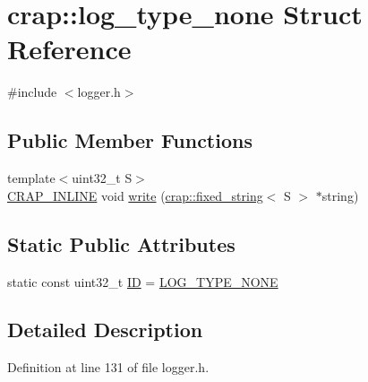 \hypertarget{structcrap_1_1log__type__none}{\section{crap\+:\+:log\+\_\+type\+\_\+none Struct Reference}
\label{structcrap_1_1log__type__none}
}


{\ttfamily \#include $<$logger.\+h$>$}

\subsection*{Public Member Functions}
\begin{DoxyCompactItemize}
\item 
{\footnotesize template$<$uint32\+\_\+t S$>$ }\\\hyperlink{config__x86_8h_a5a40526b8d842e7ff731509998bb0f1c}{C\+R\+A\+P\+\_\+\+I\+N\+L\+I\+N\+E} void \hyperlink{structcrap_1_1log__type__none_a0d844ed1b7b13c7ae0398da665d45919}{write} (\hyperlink{classcrap_1_1fixed__string}{crap\+::fixed\+\_\+string}$<$ S $>$ $\ast$string)
\end{DoxyCompactItemize}
\subsection*{Static Public Attributes}
\begin{DoxyCompactItemize}
\item 
static const uint32\+\_\+t \hyperlink{structcrap_1_1log__type__none_a507790af8e4624f88147ccbc3293407f}{I\+D} = \hyperlink{logger_8h_af309299eede8f70fa53dbabc13c2ad0b}{L\+O\+G\+\_\+\+T\+Y\+P\+E\+\_\+\+N\+O\+N\+E}
\end{DoxyCompactItemize}


\subsection{Detailed Description}


Definition at line 131 of file logger.\+h.



